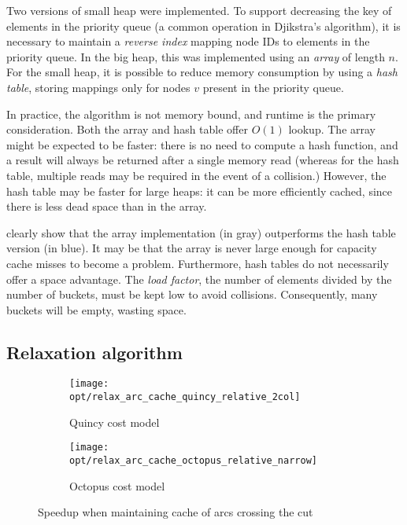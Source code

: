 Two versions of small heap were implemented. To support decreasing the key of elements in the priority queue (a common operation in Djikstra's algorithm), it is necessary to maintain a \emph{reverse index} mapping node IDs to elements in the priority queue. In the big heap, this was implemented using an \emph{array} of length $n$. For the small heap, it is possible to reduce memory consumption by using a \emph{hash table}, storing mappings only for nodes $v$ present in the priority queue.

In practice, the algorithm is not memory bound, and runtime is the primary consideration. Both the array and hash table offer $O(1)$ lookup. The array might be expected to be faster: there is no need to compute a hash function, and a result will always be returned after a single memory read (whereas for the hash table, multiple reads may be required in the event of a collision.) However, the hash table may be faster for large heaps: it can be more efficiently cached, since there is less dead space than in the array.

 clearly show that the array implementation (in gray) outperforms the hash table version (in blue). It may be that the array is never large enough for capacity cache misses to become a problem. Furthermore, hash tables do not necessarily offer a space advantage. The \emph{load factor}, the number of elements divided by the number of buckets, must be kept low to avoid collisions. Consequently, many buckets will be empty, wasting space.


\subsection{Relaxation algorithm}

\begin{figure}
    \centering
    \begin{subfigure}[c]{0.49\textwidth}
        \texttt{[image: opt/relax\_arc\_cache\_quincy\_relative\_2col]}
        \caption{Quincy cost model}
    \end{subfigure}
    \begin{subfigure}[c]{0.49\textwidth}
        \texttt{[image: opt/relax\_arc\_cache\_octopus\_relative\_narrow]}
        \caption{Octopus cost model}
    \end{subfigure}
    \caption{Speedup when maintaining cache of arcs crossing the cut}
    \label{fig:opt-relax-cache-arcs}
\end{figure}

